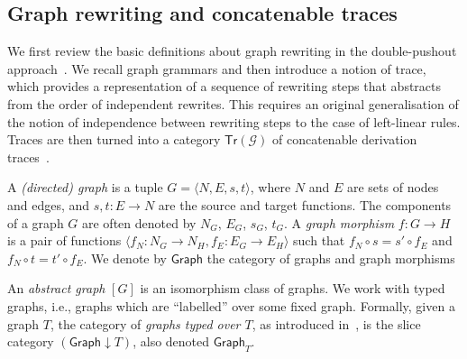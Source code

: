 \documentclass[conference]{IEEEtran}
\newcommand{\slice}[2]{\ensuremath{({#1} \downarrow {#2})}}
\newcommand{\tr}[1]{\ensuremath{\mathsf{Tr}({#1})}}
\newcommand{\graph}{\ensuremath{\mathsf{Graph}}}
\newcommand{\tgraph}[1]{\ensuremath{\mathsf{Graph}_{#1}}}
\begin{document}
\subsection{Graph rewriting and concatenable traces}
\label{ss:back-graph}

We first review the basic definitions about graph rewriting in the double-pushout approach~\cite{Ehr:TIAA}.
%
We recall graph grammars and then introduce a notion of trace, which provides a representation of a sequence of 
rewriting steps that abstracts from the order of independent rewrites. This requires an original generalisation of the notion of independence between rewriting steps to the case of left-linear rules.
%
Traces are then turned into a category 
$\tr{\mathcal{G}}$ of concatenable derivation traces~\cite{CELMR:ESSG}.


\begin{definition}
A \emph{(directed) graph} is a tuple
$G = \langle N, E, s, t \rangle$, where $N$ and $E$ are 
sets of
nodes and edges, and $s, t: E \rightarrow N$ are the source and target
functions.  The components of a graph $G$ are often denoted by
$N_G$, $E_G$, $s_G$, $t_G$.  A \emph{graph morphism}
$f: G \rightarrow H$ is a pair of functions
$\langle f_N: N_G \rightarrow N_H, f_E: E_G \rightarrow E_H\rangle$ such
that $f_N \circ s = s' \circ f_E$ and $f_N \circ t = t' \circ f_E$.
We denote by $\graph$ the category of graphs and graph morphisms
%

\end{definition}

An \emph{abstract graph} $[G]$ is an isomorphism class of
graphs.
We work with typed graphs, i.e., graphs which are
``labelled'' over some fixed graph. Formally, given a graph $T$, the category of
\emph{graphs typed over $T$}, as introduced in~\cite{CMR:GP}, is the
slice category $\slice{\graph}{T}$, also denoted $\tgraph{T}$.
\end{document}
